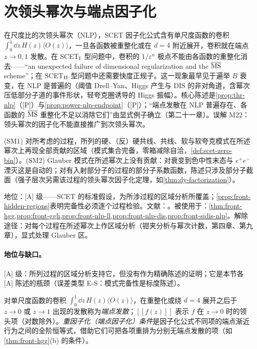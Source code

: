 \section{次领头幂次与端点因子化}\label{sec:front-nlp}

在尺度比的次领头幂次（NLP），SCET 因子化公式含有单尺度函数的卷积 $\int_0^1\dd z\,H(z)\langle O(z)\rangle$，一旦各函数被重整化或在 $d=4$ 附近展开，卷积就在端点 $z\to0,1$ 发散。在 SCET$_{\rm I}$ 型问题中，卷积的 $1/\varepsilon^n$ 极点不能由各函数的重整化消去——“an unexpected failure of dimensional regularization and the $\overline{\rm MS}$ scheme”\cite{Liu:2019oav}；在 SCET$_{\rm II}$ 型问题中还需要快度正规子。这一现象最早见于遍举 $B$ 衰变，在 NLP 是普遍的（阈值 Drell--Yan、Higgs 产生与 DIS 的非对角道，含幂次压低部分子道的事件形状，轻夸克圈诱导的 Higgs 振幅）。核心陈述是\cref{prop:thr-nlp}（[P]）与\cref{prop:power-nlp-endpoint}（[P]）；“端点发散在 NLP 普遍存在、各函数的 $\overline{\mathrm{MS}}$ 重整化不足以消除它们”由显式例子确立（第二十一章）。误解 M22：领头幂次的因子化不能直接推广到次领头幂次。

\begin{assumption}\label{asm:front-scet-modes}
(SM1) 对所考虑的过程，所列的硬、（反）硬共线、共线、软与软夸克模式在所述幂次上再现全部贡献的区域（模式集合完备，零箱减除自洽，\cref{def:scet-zero-bin}）。(SM2) Glauber 模式在所述幂次上没有贡献：对衰变到色中性末态与 $e^+e^-$ 湮灭这是自动的；对有入射部分子的过程的部分子系数函数，陈述只涉及部分子截面（强子层次另需该过程的领头幂次因子化定理，如\cref{thm:dy-factorization}）。

地位：[A] 级——SCET 的标准假设，为所涉过程的区域分析所覆盖；\cref{prop:front-hidden-regions}表明完备性必须逐个过程检验。文献：\cite{Liu:2019oav,Liu:2020wbn,Beneke:2022obx,RothsteinStewart2016}。被使用于：\cref{thm:front-hgg,prop:front-ggh,prop:front-nlp-ll,prop:front-nlp-dis,prop:front-sidis-nlp}。解除途径：对每个过程在所述幂次上作区域分析（钳夹分析与幂次计数，第四章、第九章），显式处理 Glauber 区。
\end{assumption}

\paragraph{地位与缺口。}[A] 级：所列过程的区域分析支持它，但没有作为精确陈述的证明；它是本节各 [A] 陈述的瓶颈（误差类型 E-S：模式完备性是标度陈述）。

\begin{definition}[端点发散与重因子化条件]\label{def:front-endpoint}
对单尺度函数的卷积 $\int_0^1\dd z\,H(z)\langle O(z)\rangle$，在重整化或绕 $d=4$ 展开之后于 $z\to0$ 或 $z\to1$ 出现的发散称为\emph{端点发散}；$[\![f(z)]\!]$ 表示 $f$ 在 $z\to0$ 时的领头项（对数除外）。\emph{重因子化（端点因子化）条件}是因子化公式不同项的端点渐近行为之间的全阶恒等式，借助它们可把各项重排为分别无端点发散的项（如\cref{thm:front-hgg}(b) 的条件）。
\end{definition}

